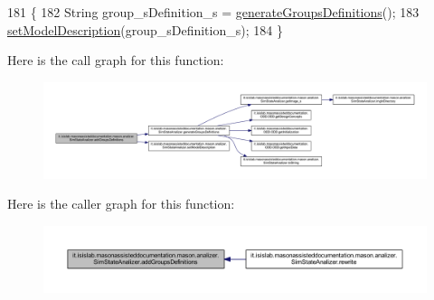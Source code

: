 \begin{DoxyCode}
181                                         \{
182         String group\_sDefinition\_s = \hyperlink{classit_1_1isislab_1_1masonassisteddocumentation_1_1mason_1_1analizer_1_1_sim_state_analizer_a08b8bb716aa03be25e82146ecbc77612}{generateGroupsDefinitions}();
183         \hyperlink{classit_1_1isislab_1_1masonassisteddocumentation_1_1mason_1_1analizer_1_1_sim_state_analizer_a17e7eab8f806cd6a275ed1ff4c9682db}{setModelDescription}(group\_sDefinition\_s);
184     \}
\end{DoxyCode}


Here is the call graph for this function\-:\nopagebreak
\begin{figure}[H]
\begin{center}
\leavevmode
\includegraphics[width=350pt]{classit_1_1isislab_1_1masonassisteddocumentation_1_1mason_1_1analizer_1_1_sim_state_analizer_a686b1fdc9c973e289069372ada60c1c8_cgraph}
\end{center}
\end{figure}




Here is the caller graph for this function\-:\nopagebreak
\begin{figure}[H]
\begin{center}
\leavevmode
\includegraphics[width=350pt]{classit_1_1isislab_1_1masonassisteddocumentation_1_1mason_1_1analizer_1_1_sim_state_analizer_a686b1fdc9c973e289069372ada60c1c8_icgraph}
\end{center}
\end{figure}


